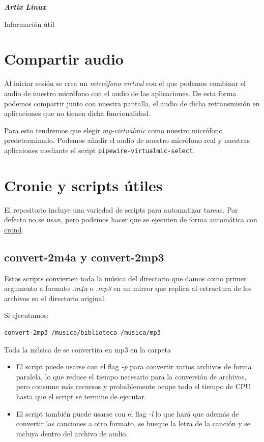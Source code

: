 \documentclass[11pt]{article}
\begin{document}
\pagestyle{empty}
\vspace*{.3\textheight}
{\hfill\Huge\itshape\textcolor{mycolor}{\textbf{Artix Linux}}\par}

{\hfill\Large Información útil\par}

\clearpage

\section{Compartir audio}

Al iniciar sesión se crea un \emph{micrófono virtual} con el que podemos combinar el audio de nuestro micrófono con el audio de las aplicaciones. De esta forma podemos compartir junto con nuestra pantalla, el audio de dicha retransmisión en aplicaciones que no tienen dicha funcionalidad.

\medskip
\noindent Para esto tendremos que elegir \emph{my-virtualmic} como nuestro micrófono predeterminado. Podemos añadir el audio de nuestro micrófono real y nuestras aplicaiones mediante el script \texttt{pipewire-virtualmic-select}.

\section{Cronie y scripts útiles}

El repositorio incluye una variedad de scripts para automatizar tareas. Por defecto no se usan, pero podemos hacer que se ejecuten de forma automática con \href{https://wiki.archlinux.org/title/cron}{crond}.

\subsection{convert-2m4a y convert-2mp3}

Estos scripts convierten toda la música del directorio que damos como primer argumento a formato \emph{.m4a} o \emph{.mp3} en un mirror que replica al estructura de los archivos en el directorio original.

\medskip
\noindent Si ejecutamos:
\begin{verbatim}
convert-2mp3 /musica/biblioteca /musica/mp3
\end{verbatim}
Toda la música de  se convertira en mp3 en la carpeta 
\begin{itemize}
	\item El script puede usarse con el flag \emph{-p} para convertir varios archivos de forma paralela, lo que reduce el tiempo necesario para la conversión de archivos, pero consume más recursos y probablemente ocupe todo el tiempo de CPU hasta que el script se termine de ejecutar.
	\item El script también puede usarse con el flag \emph{-l} lo que hará que además de convertir las canciones a otro formato, se busque la letra de la canción y se incluya dentro del archivo de audio.
\end{itemize}
\end{document}
